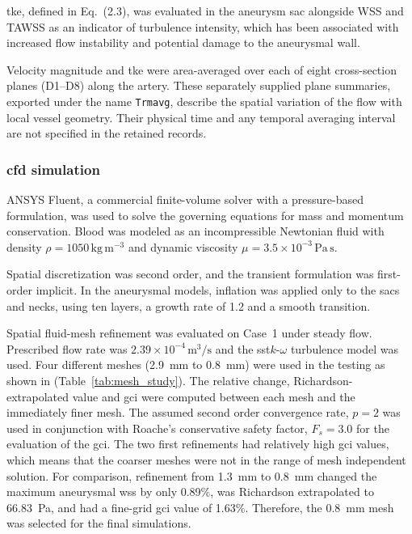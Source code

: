 \documentclass[12pt,a4paper]{article}
\newcommand{\cfdrevision}[1]{#1} %
\newcommand{\WSS}{\ac{wss}\xspace}
\newcommand{\TKE}{\ac{tke}\xspace}
\newcommand{\SST}{\ac{sst}\xspace}
\newcommand{\GCI}{\ac{gci}\xspace}
\newcommand{\CFDcap}{\Ac{cfd}\xspace}
\newcommand{\TKEcap}{\Ac{tke}\xspace}
\theoremstyle{definition}
\numberwithin{equation}{section}
\providecommand{\DIFaddtex}[1]{{\protect\color{blue} \sf #1}} %
\providecommand{\DIFdeltex}[1]{{\protect\color{red} \scriptsize #1}} %
\providecommand{\DIFaddbegin}{} %
\providecommand{\DIFaddend}{} %
\providecommand{\DIFdelbegin}{} %
\providecommand{\DIFdelend}{} %
\providecommand{\DIFadd}[1]{\texorpdfstring{\DIFaddtex{#1}}{#1}} %
\providecommand{\DIFdel}[1]{\texorpdfstring{\DIFdeltex{#1}}{}} %
\newcommand{\DIFscaledelfig}{0.5}
\newlength{\DIFdelgraphicswidth} %
\newlength{\DIFdelgraphicsheight} %
\newcommand{\DIFaddincludegraphics}[2][]{{\color{blue}\fbox{\DIFOincludegraphics[#1]{#2}}}} %
\newcommand{\DIFdelincludegraphics}[2][]{%
\sbox{\DIFdelgraphicsbox}{\DIFOincludegraphics[#1]{#2}}%
\settoboxwidth{\DIFdelgraphicswidth}{\DIFdelgraphicsbox} %
\settoboxtotalheight{\DIFdelgraphicsheight}{\DIFdelgraphicsbox} %
\scalebox{\DIFscaledelfig}{%
\parbox[b]{\DIFdelgraphicswidth}{\usebox{\DIFdelgraphicsbox}\\[-\baselineskip] \rule{\DIFdelgraphicswidth}{0em}}\llap{\resizebox{\DIFdelgraphicswidth}{\DIFdelgraphicsheight}{%
\setlength{\unitlength}{\DIFdelgraphicswidth}%
\begin{picture}(1,1)%
\thicklines\linethickness{2pt} %
{\color[rgb]{1,0,0}\put(0,0){\framebox(1,1){}}}%
{\color[rgb]{1,0,0}\put(0,0){\line( 1,1){1}}}%
{\color[rgb]{1,0,0}\put(0,1){\line(1,-1){1}}}%
\end{picture}%
}\hspace*{3pt}}} %
} %
\DeclareRobustCommand{\DIFaddbegin}{\DIFOaddbegin \let\includegraphics\DIFaddincludegraphics} %
\DeclareRobustCommand{\DIFaddend}{\DIFOaddend \let\includegraphics\DIFOincludegraphics} %
\DeclareRobustCommand{\DIFdelbegin}{\DIFOdelbegin \let\includegraphics\DIFdelincludegraphics} %
\DeclareRobustCommand{\DIFdelend}{\DIFOaddend \let\includegraphics\DIFOincludegraphics} %
\renewcommand{\DIFaddtex}[1]{{\protect\color{red}#1}}
\renewcommand{\DIFdeltex}[1]{}
\renewcommand{\DIFdel}[1]{}
\renewcommand{\DIFaddincludegraphics}[2][]{\DIFOincludegraphics[#1]{#2}}
\renewcommand{\DIFdelincludegraphics}[2][]{}
\renewcommand{\cfdrevision}[1]{\textcolor{red}{#1}}
\def\DIFaddbegin{}\def\DIFaddend{}%
\def\DIFdelbegin{}\def\DIFdelend{}%
\def\cfdrevision#1{#1}%
\begin{document}
\TKEcap, defined in Eq.~(2.3), was evaluated in the aneurysm sac alongside WSS and TAWSS as an indicator of turbulence intensity, which has been associated with increased flow instability and potential damage to the aneurysmal wall.

\DIFdelbegin \DIFdel{Additionally, velocity magnitudes were determined at eight predetermined cross-section planes (D1--D8) across the arterial axis and examined the spatial development of flow and its association with local vessel geometry. This was an analysis based on planes which allowed the direct correlation between morphometric parameters (diameter) and hemodynamic quantities (velocity, }%
\DIFdel{).
}\DIFdelend \DIFaddbegin \DIFadd{\cfdrevision{Velocity magnitude and \TKE were area-averaged over each of eight cross-section planes (D1--D8) along the artery. These separately supplied plane summaries, exported under the name \texttt{Trmavg}, describe the spatial variation of the flow with local vessel geometry. Their physical time and any temporal averaging interval are not specified in the retained records.}
}\DIFaddend 




\subsubsection{\label{CFD Simulation}\texorpdfstring{\CFDcap}{CFD} simulation}ANSYS Fluent, a commercial finite-volume solver with a pressure-based formulation, was used to solve the governing equations for mass and momentum conservation. Blood was modeled as an incompressible Newtonian fluid with density \(\rho = 1050\,\mathrm{kg\,m^{-3}}\) and dynamic viscosity \(\mu = 3.5 \times 10^{-3}\,\mathrm{Pa\,s}\).

\DIFdelbegin \DIFdel{The spatial convergence of the steady flow results was checked by performing a mesh refinement study. }\DIFdelend \DIFaddbegin \DIFadd{\cfdrevision{Spatial discretization was second order, and the transient formulation was first-order implicit. In the aneurysmal models, inflation was applied only to the sacs and necks, using ten layers, a growth rate of 1.2 and a smooth transition.}
}


\DIFadd{\cfdrevision{Spatial fluid-mesh refinement was evaluated on Case~1 under steady flow.} }\DIFaddend Prescribed flow rate was \(2.39 \times 10^{-4} \, \mathrm{m^3/s}\) and the \SST \(k\)-\(\omega\) turbulence model was used. Four different meshes (2.9~mm to 0.8~mm) were used in the testing as shown in (Table~\ref{tab:mesh_study}). The relative change, Richardson-extrapolated value and \GCI were computed between each mesh and the immediately finer mesh. The assumed second order convergence rate, $p=2$ was used in conjunction with Roache's conservative safety factor, $F_s=3.0$ for the evaluation of the \GCI. The two first refinements had relatively high \GCI values, which means that the coarser meshes were not in the range of mesh independent solution. For comparison, refinement from 1.3~mm to 0.8~mm changed the maximum aneurysmal \WSS by only 0.89\%, was Richardson extrapolated to 66.83~Pa, and had a fine-grid \GCI value of 1.63\%. Therefore, the 0.8~mm mesh was selected for the final simulations.
\end{document}
